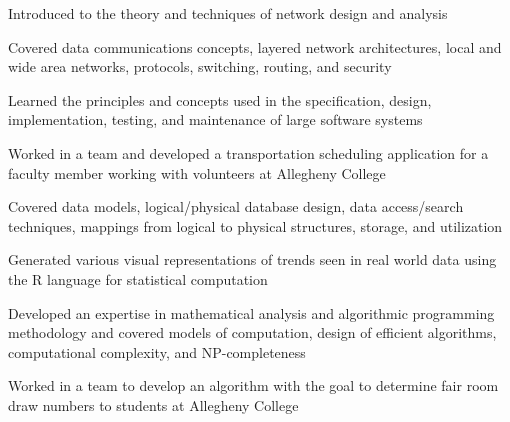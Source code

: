 \documentclass[]{brandon_ginoza_resume}
\begin{document}
\begin{minipage}[t]{0.66\textwidth}
\begin{tightemize}
	\item Introduced to the theory and techniques of network design and analysis
	\item Covered data communications concepts, layered network architectures, local and wide area networks, protocols, switching, routing, and security
\end{tightemize}
\sectionsep

\location{}
\begin{tightemize}
	\item Learned the principles and concepts used in the specification, design, implementation, testing, and maintenance of large software systems
	\item Worked in a team and developed a transportation scheduling application for a faculty member working with volunteers at Allegheny College
\end{tightemize}
\sectionsep


\location{}
\begin{tightemize}
	\item Covered data models, logical/physical database design, data access/search techniques, mappings from logical to physical structures, storage, and utilization
	\item Generated various visual representations of trends seen in real world data using the R language for statistical computation
\end{tightemize}
\sectionsep

\location{}
\begin{tightemize}
  \item Developed an expertise in mathematical analysis and algorithmic programming methodology and covered models of computation, design of efficient algorithms, computational complexity, and NP-completeness
  \item Worked in a team to develop an algorithm with the goal to determine fair room draw numbers to students at Allegheny College
\end{tightemize}
\sectionsep



\end{minipage}
\end{document}
